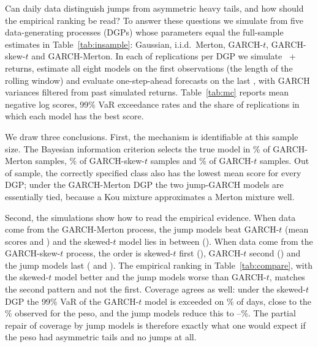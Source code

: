 Can daily data distinguish jumps from asymmetric heavy tails, and how should the empirical ranking be read? To answer these questions we simulate from five data-generating processes (DGPs) whose parameters equal the full-sample estimates in Table~\ref{tab:insample}: Gaussian, i.i.d.\ Merton, GARCH-$t$, GARCH-skew-$t$ and GARCH-Merton. In each of \mcReps{} replications per DGP we simulate \mcTrain{}~+~\mcTest{} returns, estimate all eight models on the first \mcTrain{} observations (the length of the rolling window) and evaluate one-step-ahead forecasts on the last \mcTest{}, with GARCH variances filtered from past simulated returns. Table~\ref{tab:mc} reports mean negative log scores, 99\% VaR exceedance rates and the share of replications in which each model has the best score.

\begin{table}[t]
\centering\small
\caption{Monte Carlo results: \mcReps{} replications per DGP, \mcTrain{} estimation and \mcTest{} evaluation observations. First row of each block: mean negative log score (bold: lowest). Second row: mean 99\% VaR exceedance rate in \% (nominal 1\%). Third row: share of replications in which the model has the lowest log score.}\label{tab:mc}
\resizebox{\linewidth}{!}{}
\end{table}

We draw three conclusions. First, the mechanism is identifiable at this sample size. The Bayesian information criterion selects the true model in \mcBicGarchMertonGarchMerton\% of GARCH-Merton samples, \mcBicGarchSkewTGarchSkewT\% of GARCH-skew-$t$ samples and \mcBicGarchTGarchT\% of GARCH-$t$ samples. Out of sample, the correctly specified class also has the lowest mean score for every DGP; under the GARCH-Merton DGP the two jump-GARCH models are essentially tied, because a Kou mixture approximates a Merton mixture well.

Second, the simulations show how to read the empirical evidence. When data come from the GARCH-Merton process, the jump models beat GARCH-$t$ (mean scores \mcNlsGarchMertonGarchMerton{} and \mcNlsGarchMertonGarchT) and the skewed-$t$ model lies in between (\mcNlsGarchMertonGarchSkewT). When data come from the GARCH-skew-$t$ process, the order is skewed-$t$ first (\mcNlsGarchSkewTGarchSkewT), GARCH-$t$ second (\mcNlsGarchSkewTGarchT) and the jump models last (\mcNlsGarchSkewTGarchMerton{} and \mcNlsGarchSkewTGarchKou). The empirical ranking in Table~\ref{tab:compare}, with the skewed-$t$ model better and the jump models worse than GARCH-$t$, matches the second pattern and not the first. Coverage agrees as well: under the skewed-$t$ DGP the 99\% VaR of the GARCH-$t$ model is exceeded on \mcExcGarchSkewTGarchT\% of days, close to the \rateNNGarchT\% observed for the peso, and the jump models reduce this to \mcExcGarchSkewTGarchKou--\mcExcGarchSkewTGarchMerton\%. The partial repair of coverage by jump models is therefore exactly what one would expect if the peso had asymmetric tails and no jumps at all.

